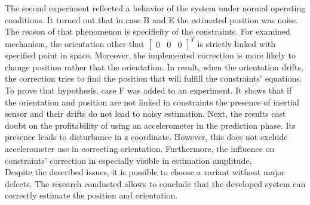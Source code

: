 The second experiment reflected a behavior of the system under normal operating conditions. It turned out that in case B and E the estimated position was noise. The reason of that phenomenon is specificity of the constraints. For examined mechanism, the orientation other that $\begin{bmatrix}0 & 0 & 0 \end{bmatrix}^T$ is strictly linked with specified point in space. Moreover, the implemented correction is more likely to change position rather that the orientation. In result, when the orientation drifts, the correction tries to find the position that will fulfill the constraints' equations. To prove that hypothesis, case F was added to an experiment. It shows that if the orientation and position are not linked in constraints the presence of inertial sensor and their drifts do not lead to noisy estimation. Next, the results cast doubt on the profitability of using an accelerometer in the prediction phase. Its presence leads to disturbance in z coordinate. However, this does not exclude accelerometer use in correcting orientation. Furthermore, the influence on constraints' correction in especially visible in estimation amplitude. \\

  
Despite the described issues, it is possible to choose a variant without major defects.
The research conducted allows to conclude that the developed system can correctly estimate the position and orientation. 



